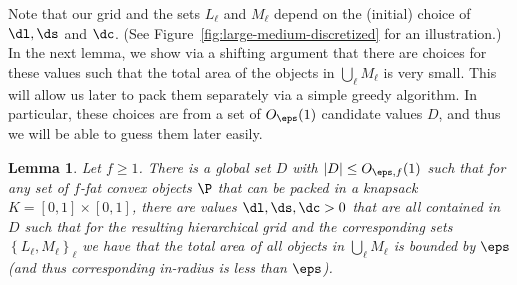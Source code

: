 \documentclass[10pt,a4paper]{article}
\newtheorem{lemma}{Lemma}[section]
\theoremstyle{plain}
\theoremstyle{plain}
\theoremstyle{plain}
\theoremstyle{definition}
\begin{document}
Note that our grid and the sets $L_{\ell}$ and $M_{\ell}$ depend
on the (initial) choice of $\dl, \ds$ and $\dc$. (See Figure~\ref{fig:large-medium-discretized} for an illustration.) In the next lemma, we show via
a shifting argument that there are choices for these values such that the
total area of the objects in $\bigcup_{\ell}M_{\ell}$ is very small.
This will allow us later to pack them separately via a simple greedy
algorithm. In particular, these choices are from a set of $O_\eps(1)$ candidate values $D$, and thus
we will be able to guess them later easily.


\begin{lemma}\label{lem:medium-items}Let $f\ge 1$. There is a global set $D$ with $|D|\le O_{\eps,f}(1)$
such that for any set of $f$-fat convex objects $\P$ that can be packed
in a knapsack $K=[0,1]\times[0,1]$, there are values $\dl,\ds,\dc>0$
that are all contained in $D$
such that for the resulting hierarchical grid and the corresponding
sets $\left\{ L_{\ell},M_{\ell}\right\} _{\ell}$ we have that the
total area of all objects in $\bigcup_{\ell}M_{\ell}$ is bounded
by $\eps$ (and thus corresponding in-radius is less than $\eps$).
\end{lemma}
\end{document}

